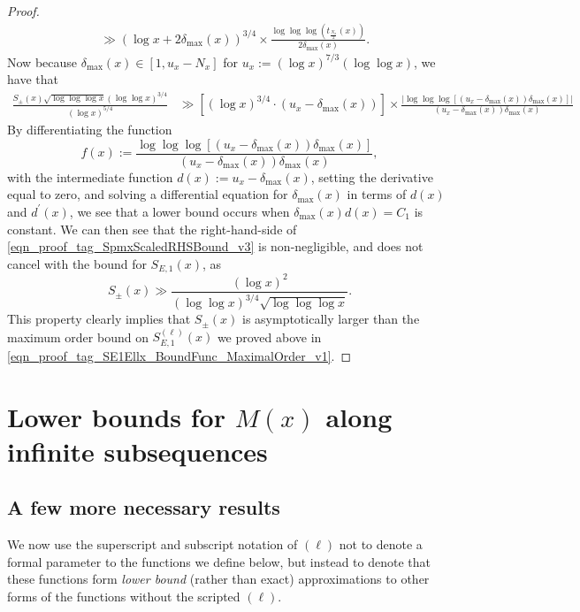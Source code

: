 \documentclass[11pt,reqno,a4letter]{article}
\numberwithin{figure}{section}
\numberwithin{table}{section}
\theoremstyle{plain}
\numberwithin{theorem}{section}
\theoremstyle{definition}
\begin{document}
\begin{proof}
\begin{align*}
     & \gg (\log x + 2 \delta_{\max}(x))^{3/4} \times \frac{\log\log\log(t_{\frac{N_x}{2}}(x))}{2 \delta_{\max}(x)}. 
\end{align*} 
Now because $\delta_{\max}(x) \in [1, u_x - N_x]$ for $u_x := (\log x)^{7/3} (\log\log x)$, 
we have that 
\begin{align} 
\label{eqn_proof_tag_SpmxScaledRHSBound_v3} 
\frac{S_{\pm}(x) \sqrt{\log\log\log x} (\log\log x)^{3/4}}{(\log x)^{5/4}} & \gg 
     \left[(\log x)^{3/4} \cdot (u_x - \delta_{\max}(x))\right] \times 
     \frac{\left\lvert \log\log\log\left[(u_x - \delta_{\max}(x)) 
     \delta_{\max}(x)\right] \right\rvert}{(u_x - \delta_{\max}(x)) \delta_{\max}(x)} 
\end{align} 
By differentiating the function 
\[
f(x) := \frac{\log\log\log\left[(u_x - \delta_{\max}(x)) 
        \delta_{\max}(x)\right]}{(u_x - \delta_{\max}(x)) \delta_{\max}(x)}, 
\] 
with the intermediate function $d(x) := u_x - \delta_{\max}(x)$, 
setting the derivative equal to zero, and 
solving a differential equation for $\delta_{\max}(x)$ in terms of 
$d(x)$ and $d^{\prime}(x)$, we see that a lower bound occurs 
when $\delta_{\max}(x) d(x) = C_1$ is constant. 
We can then see that the 
right-hand-side of \eqref{eqn_proof_tag_SpmxScaledRHSBound_v3} 
is non-negligible, and does not cancel with the bound for $S_{E,1}(x)$, as 
\[
S_{\pm}(x) \gg \frac{(\log x)^{2}}{(\log\log x)^{3/4} \sqrt{\log\log\log x}}. 
\]
This property clearly implies that $S_{\pm}(x)$ is asymptotically larger than the 
maximum order bound on $S_{E,1}^{(\ell)}(x)$ we proved above in 
\eqref{eqn_proof_tag_SE1Ellx_BoundFunc_MaximalOrder_v1}. 
\end{proof} 

\newpage 
\section{Lower bounds for $M(x)$ along infinite subsequences} 
\label{Section_KeyApplications} 

\subsection{A few more necessary results} 
\label{subsubSection_RoutineProofsNeededForMainBoundOnGInvxFunc} 

We now use the superscript and subscript notation of 
$(\ell)$ not to denote a formal parameter to 
the functions we define below, but instead to denote that these functions form 
\emph{lower bound} (rather than exact) 
approximations to other forms of the functions without the scripted $(\ell)$. 
\end{document}
